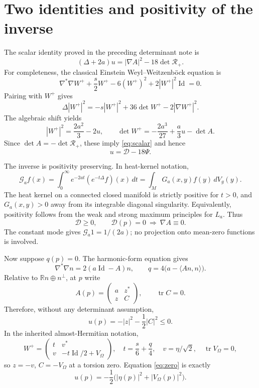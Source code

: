 \documentclass[11pt]{article}
\theoremstyle{remark}\newtheorem{remark}[theorem]{Remark}
\newcommand{\tr}{\operatorname{tr}}
\newcommand{\Id}{\operatorname{Id}}
\newcommand{\RR}{\mathcal R_+}
\begin{document}
\section{Two identities and positivity of the inverse}
The scalar identity proved in the preceding determinant note \cite{Project}
is
\begin{equation}\label{eq:scalar}
 (\Delta+2a)u=|\nabla A|^2-18\det\RR.
\end{equation}
For completeness, the classical Einstein Weyl--Weitzenb\"ock equation
\cite{Derdzinski} is
\[
 \nabla^*\nabla W^++\frac s2W^+-6(W^+)^2+2|W^+|^2\Id=0.
\]
Pairing with $W^+$ gives
\[
 \Delta|W^+|^2=-s|W^+|^2+36\det W^+-2|\nabla W^+|^2.
\]
The algebraic shift yields
\[
 |W^+|^2=\frac{2a^2}{3}-2u,\qquad
 \det W^+=-\frac{2a^3}{27}+\frac a3u-\det A.
\]
Since $\det A=-\det\RR$, these imply \eqref{eq:scalar} and hence
\begin{equation}\label{eq:resolvent}
 \boxed{u=\mathcal D-18\Psi.}
\end{equation}

The inverse is positivity preserving. In heat-kernel notation,
\begin{equation}\label{eq:heat}
 \mathcal G_a f(x)=\int_0^\infty e^{-2at}(e^{-t\Delta}f)(x)\,dt
 =\int_M G_a(x,y)f(y)\,dV_g(y).
\end{equation}
The heat kernel on a connected closed manifold is strictly positive for
$t>0$, and $G_a(x,y)>0$ away from its integrable diagonal singularity.
Equivalently, positivity follows from the weak and strong maximum
principles for $L_a$. Thus
\[
 \mathcal D\ge0,\qquad
 \mathcal D(p)=0\ \Longrightarrow\ \nabla A\equiv0.
\]
The constant mode gives $\mathcal G_a1=1/(2a)$; no projection onto
mean-zero functions is involved.

Now suppose $q(p)=0$. The harmonic-form equation gives
\begin{equation}\label{eq:harmonic}
 \nabla^*\nabla n=2(a\Id-A)n,\qquad
 q=4\bigl(a-\langle An,n\rangle\bigr).
\end{equation}
Relative to $\mathbb Rn\oplus n^\perp$, at $p$ write
\[
 A(p)=\begin{pmatrix}a&z^*\\z&C\end{pmatrix},\qquad\tr C=0.
\]
Therefore, without any determinant assumption,
\begin{equation}\label{eq:zero}
 \boxed{u(p)=-|z|^2-\frac12|C|^2\le0.}
\end{equation}
In the inherited almost-Hermitian notation,
\[
 W^+=\begin{pmatrix}t&v^*\\v&-t\Id/2+V_\Omega\end{pmatrix},\quad
 t=\frac s6+\frac q4,\quad v=\eta/\sqrt2,\quad\tr V_\Omega=0,
\]
so $z=-v$, $C=-V_\Omega$ at a torsion zero. Equation \eqref{eq:zero}
is exactly
\[
 u(p)=-\frac12\bigl(|\eta(p)|^2+|V_\Omega(p)|^2\bigr).
\]
\end{document}
